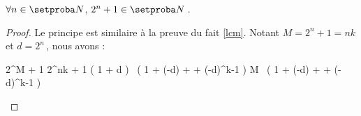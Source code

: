 \begin{fact}
	$\forall n \in \ourset$, $2^n + 1 \in \ourset$\,.
\end{fact}

\begin{proof}
	Le principe est similaire à la preuve du fait \ref{lcm}.
	Notant $M = 2^n + 1 = n k$ et $d = 2^n$\,, nous avons :

	\medskip
	
	\begin{stepcalc}[style = sar]
		2^M + 1
	\explnext{}
		2^{nk} + 1
	\explnext{}
		\big( 1 + d \big) \, \big( 1 + (-d) + \cdots + (-d)^{k-1} \big)
	\explnext{}
		M \, \big( 1 + (-d) + \cdots + (-d)^{k-1} \big)
	\end{stepcalc}
	
	\leavevmode
\end{proof}

